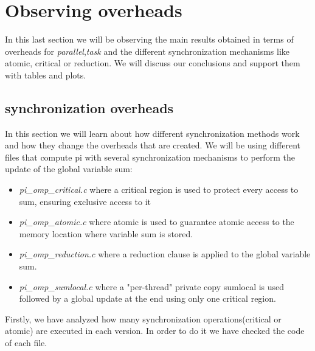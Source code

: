 \documentclass[12]{article}
\begin{document}
\section{Observing overheads}

In this last section we will be observing the main results obtained in terms of overheads for \textit{parallel},\textit{task} and the different synchronization mechanisms like atomic, critical or reduction. We will discuss our conclusions and support them with tables and plots.

\subsection{synchronization overheads}
In this section we will learn about how different synchronization methods work and how they change the overheads that are created. We will be using different files that compute pi with several synchronization mechanisms to perform the update of the global variable sum:
\begin{itemize}
\item \textit{pi\_omp\_critical.c} where a critical region is used to protect every access to sum, ensuring exclusive access to it
\item \textit{pi\_omp\_atomic.c} where atomic is used to guarantee atomic access to the memory location where variable sum is stored. 
\item \textit{pi\_omp\_reduction.c} where a reduction clause is applied to the global variable sum. 
\item \textit{pi\_omp\_sumlocal.c} where a "per-thread" private copy sumlocal is used followed by a global update at the end using only one critical region. 
\end{itemize} 

Firstly, we have analyzed how many synchronization operations(critical or atomic) are executed in each version.  In order to do it we have checked the code of each file. 
\end{document}
